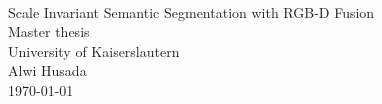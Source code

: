 




 


 \begin{titlepage}
 	\mbox{}\vspace{5\baselineskip}\\
 	\sffamily\huge
 	\centering
 	Scale Invariant Semantic Segmentation with RGB-D Fusion
 	\vspace{3\baselineskip}\\
 	\rmfamily\Large
 	Master thesis \\ University of Kaiserslautern
 	\vspace{2\baselineskip}\\
 	\rmfamily\Large
 	Alwi Husada
 	\vspace{1\baselineskip}\\
 	\today
 \end{titlepage}

% 
